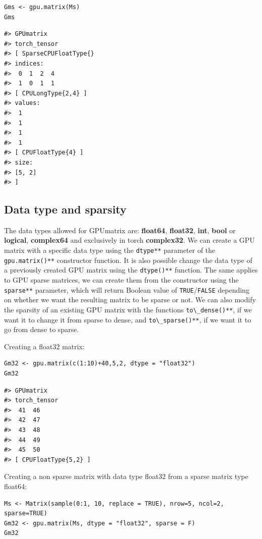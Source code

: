 \begin{verbatim}
Gms <- gpu.matrix(Ms)
Gms
\end{verbatim}

\begin{verbatim}
#> GPUmatrix
#> torch_tensor
#> [ SparseCPUFloatType{}
#> indices:
#>  0  1  2  4
#>  1  0  1  1
#> [ CPULongType{2,4} ]
#> values:
#>  1
#>  1
#>  1
#>  1
#> [ CPUFloatType{4} ]
#> size:
#> [5, 2]
#> ]
\end{verbatim}

\hypertarget{data-type-and-sparsity}{%
\subsection{Data type and sparsity}\label{data-type-and-sparsity}}

The data types allowed for GPUmatrix are: \textbf{float64}, \textbf{float32}, \textbf{int}, \textbf{bool} or \textbf{logical}, \textbf{complex64} and exclusively in torch \textbf{complex32}. We can create a GPU matrix with a specific data type using the \texttt{dtype**} parameter of the \texttt{gpu.matrix()**} constructor function. It is also possible change the data type of a previously created GPU matrix using the \texttt{dtype()**} function. The same applies to GPU sparse matrices, we can create them from the constructor using the \texttt{sparse**} parameter, which will return Boolean value of \texttt{TRUE}/\texttt{FALSE} depending on whether we want the resulting matrix to be sparse or not. We can also modify the sparsity of an existing GPU matrix with the functions \texttt{to\textbackslash{}\_dense()**}, if we want it to change it from sparse to dense, and \texttt{to\textbackslash{}\_sparse()**}, if we want it to go from dense to sparse.

Creating a float32 matrix:

\begin{verbatim}
Gm32 <- gpu.matrix(c(1:10)+40,5,2, dtype = "float32")
Gm32
\end{verbatim}

\begin{verbatim}
#> GPUmatrix
#> torch_tensor
#>  41  46
#>  42  47
#>  43  48
#>  44  49
#>  45  50
#> [ CPUFloatType{5,2} ]
\end{verbatim}

Creating a non sparse matrix with data type float32 from a sparse matrix type float64:

\begin{verbatim}
Ms <- Matrix(sample(0:1, 10, replace = TRUE), nrow=5, ncol=2, sparse=TRUE)
Gm32 <- gpu.matrix(Ms, dtype = "float32", sparse = F)
Gm32
\end{verbatim}

